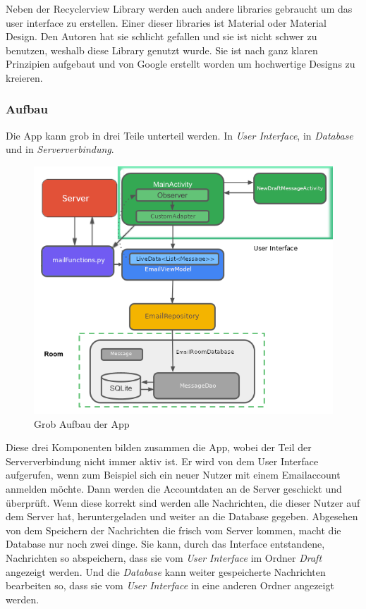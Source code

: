 \documentclass[a4paper,11pt]{article}
\begin{document}
Neben der Recyclerview Library werden auch andere libraries gebraucht um das \gls{user interface} zu erstellen. Einer dieser libraries ist Material oder Material Design. 
Den Autoren hat sie schlicht gefallen und sie ist nicht schwer zu benutzen, weshalb diese Library genutzt wurde. Sie ist nach ganz klaren Prinzipien aufgebaut 
und von Google erstellt worden um hochwertige Designs zu kreieren. \cite{materialDesigne}


\subsubsection{Aufbau}

Die App kann grob in drei Teile unterteil werden. In \textit{User Interface}, in \textit{Database} und in \textit{Serververbindung}. 

\begingroup
\setlength{\intextsep}{7pt}
\setlength{\columnsep}{15pt}

\begin{figure}
\centering
    \includegraphics[scale=.52]{media/AppStructureFull.png}
\caption{Grob Aufbau der App}
\end{figure}

\nohyphenation

Diese drei Komponenten bilden zusammen die App, wobei der Teil der Serververbindung nicht immer aktiv ist. Er wird von dem User Interface
aufgerufen, wenn zum Beispiel sich ein neuer Nutzer mit einem Emailaccount anmelden möchte. Dann werden die Accountdaten an de Server geschickt und überprüft.
Wenn diese korrekt sind werden alle Nachrichten, die dieser Nutzer auf dem Server hat, heruntergeladen und weiter an die Database gegeben. Abgesehen von dem 
Speichern der Nachrichten die frisch vom Server kommen, macht die Database nur noch zwei dinge. Sie kann, durch das Interface entstandene, Nachrichten so abspeichern, dass sie 
vom \textit{User Interface} im Ordner \textit{Draft} angezeigt werden. Und die \textit{Database} kann weiter gespeicherte Nachrichten bearbeiten so, dass sie vom 
\textit{User Interface} in eine anderen Ordner angezeigt werden.
\end{document}
